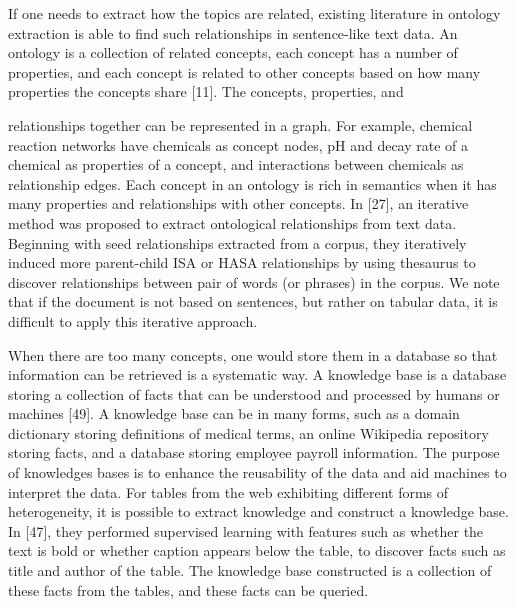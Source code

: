 If one needs to extract how the topics are related, existing literature in ontology extraction is able to find such relationships in sentence-like text data. An ontology is a collection of related concepts, each concept has a number of properties, and each concept is related to other concepts based on how many properties the concepts share [11]. The concepts, properties, and

relationships together can be represented in a graph. For example, chemical reaction networks have chemicals as concept nodes, pH and decay rate of a chemical as properties of a concept, and interactions between chemicals as relationship edges. Each concept in an ontology is rich in semantics when it has many properties and relationships with other concepts. In [27], an iterative method was proposed to extract ontological relationships from text data. Beginning with seed relationships extracted from a corpus, they iteratively induced more parent-child ISA or HASA relationships by using thesaurus to discover relationships between pair of words (or phrases) in the corpus. We note that if the document is not based on sentences, but rather on tabular data, it is difficult to apply this iterative approach.

When there are too many concepts, one would store them in a database so that information can be retrieved is a systematic way. A knowledge base is a database storing a collection of facts that can be understood and processed by humans or machines [49]. A knowledge base can be in many forms, such as a domain dictionary storing definitions of medical terms, an online Wikipedia repository storing facts, and a database storing employee payroll information. The purpose of knowledges bases is to enhance the reusability of the data and aid machines to interpret the data. For tables from the web exhibiting different forms of heterogeneity, it is possible to extract knowledge and construct a knowledge base. In [47], they performed supervised learning with features such as whether the text is bold or whether caption appears below the table, to discover facts such as title and author of the table. The knowledge base constructed is a collection of these facts from the tables, and these facts can be queried.

